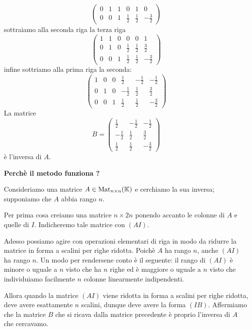 \begin{example}
\[\begin{pmatrix}
			0 & 1 & 1 & 0           & 1           & 0            \\
			0 & 0 & 1 & \frac{1}{2} & \frac{1}{2} & -\frac{3}{2}
		\end{pmatrix}
	\]
	sottraiamo alla seconda riga la terza riga
	\[
		\begin{pmatrix}
			1 & 1 & 0 & 0           & 0           & 1            \\
			0 & 1 & 0 & \frac{1}{2} & \frac{1}{2} & \frac{3}{2}  \\
			0 & 0 & 1 & \frac{1}{2} & \frac{1}{2} & -\frac{3}{2}
		\end{pmatrix}
	\]
	infine sottriamo alla prima riga la seconda:
	\[
		\begin{pmatrix}
			1 & 0 & 0 & \frac{1}{2}  & -\frac{1}{2} & -\frac{1}{2} \\
			0 & 1 & 0 & -\frac{1}{2} & \frac{1}{2}  & \frac{3}{2}  \\
			0 & 0 & 1 & \frac{1}{2}  & \frac{1}{2}  & -\frac{3}{2}
		\end{pmatrix}
	\]
	La matrice
	\[
		B = \begin{pmatrix}
			\frac{1}{2}  & -\frac{1}{2} & -\frac{1}{2} \\
			-\frac{1}{2} & \frac{1}{2}  & \frac{3}{2}  \\
			\frac{1}{2}  & \frac{1}{2}  & -\frac{3}{2}
		\end{pmatrix}
	\]
	è l'inversa di $A$.
\end{example}

\textbf{Perchè il metodo funziona ?}

Consideriamo una matrice $A \in \operatorname{Mat}_{n \times n}(\mathbb{K})$ e cerchiamo la sua
inversa; supponiamo che $A$ abbia rango $n$.

Per prima cosa creiamo una matrice $n \times 2n$ ponendo accanto le colonne di $A$
e quelle di $I$. Indicheremo tale matrice con $(A I)$.

Adesso possiamo agire con operazioni elementari di riga in modo da ridurre la
matrice in forma a scalini per righe ridotta. Poichè $A$ ha rango $n$, anche
$(A I)$ ha rango $n$. Un modo per rendersene conto è il seguente: il rango di
$(A I)$ è minore o uguale a $n$ visto che ha $n$ righe ed è maggiore o uguale
a $n$ visto che individuiamo facilmente $n$ colonne linearmente indipendenti.

Allora quando la matrice $(A I)$ viene ridotta in forma a scalini per righe ridotta,
deve avere esattamente $n$ scalini, dunque deve avere la forma $(I B)$.
Affermiamo che la matrice $B$ che si ricava dalla matrice precedente è proprio
l'inversa di $A$ che cercavamo.

